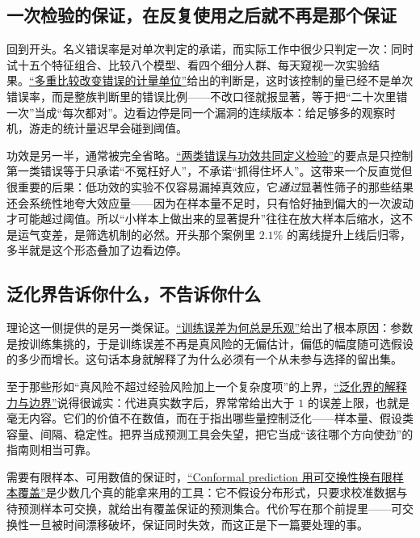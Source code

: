 \subsection{一次检验的保证，在反复使用之后就不再是那个保证}

回到开头。名义错误率是对单次判定的承诺，而实际工作中很少只判定一次：同时试十五个特征组合、比较八个模型、看四个细分人群、每天窥视一次实验结果。\hyperref[sec:11-Mathematical-Statistics/05-Hypothesis-Testing/04]{``多重比较改变错误的计量单位''}给出的判断是，这时该控制的量已经不是单次错误率，而是整族判断里的错误比例——不改口径就报显著，等于把``二十次里错一次''当成``每次都对''。边看边停是同一个漏洞的连续版本：给足够多的观察时机，游走的统计量迟早会碰到阈值。

功效是另一半，通常被完全省略。\hyperref[sec:11-Mathematical-Statistics/05-Hypothesis-Testing/01]{``两类错误与功效共同定义检验''}的要点是只控制第一类错误等于只承诺``不冤枉好人''，不承诺``抓得住坏人''。这带来一个反直觉但很重要的后果：低功效的实验不仅容易漏掉真效应，它\emph{通过}显著性筛子的那些结果还会系统性地夸大效应量——因为在样本量不足时，只有恰好抽到偏大的一次波动才可能越过阈值。所以``小样本上做出来的显著提升''往往在放大样本后缩水，这不是运气变差，是筛选机制的必然。开头那个案例里 \(2.1\%\) 的离线提升上线后归零，多半就是这个形态叠加了边看边停。

\subsection{泛化界告诉你什么，不告诉你什么}

理论这一侧提供的是另一类保证。\hyperref[sec:13-Machine-Learning/10-Learning-Theory/01]{``训练误差为何总是乐观''}给出了根本原因：参数是按训练集挑的，于是训练误差不再是真风险的无偏估计，偏低的幅度随可选假设的多少而增长。这句话本身就解释了为什么必须有一个从未参与选择的留出集。

至于那些形如``真风险不超过经验风险加上一个复杂度项''的上界，\hyperref[sec:13-Machine-Learning/10-Learning-Theory/04]{``泛化界的解释力与边界''}说得很诚实：代进真实数字后，界常常给出大于 \(1\) 的误差上限，也就是毫无内容。它们的价值不在数值，而在于指出哪些量控制泛化——样本量、假设类容量、间隔、稳定性。把界当成预测工具会失望，把它当成``该往哪个方向使劲''的指南则相当可靠。

需要有限样本、可用数值的保证时，\hyperref[sec:11-Mathematical-Statistics/07-Statistical-Decision-and-Reliable-Prediction/05]{``Conformal prediction 用可交换性换有限样本覆盖''}是少数几个真的能拿来用的工具：它不假设分布形式，只要求校准数据与待预测样本可交换，就给出有覆盖保证的预测集合。代价写在那个前提里——可交换性一旦被时间漂移破坏，保证同时失效，而这正是下一篇要处理的事。

